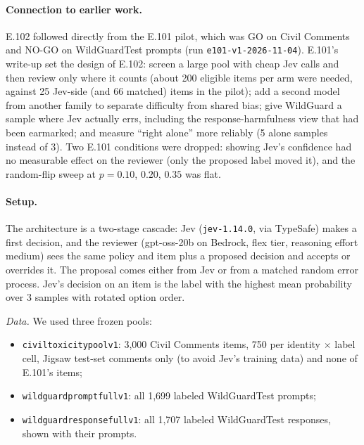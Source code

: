 \documentclass[11pt]{article}
\renewcommand{\_}{\origunderscore\allowbreak}
\begin{document}
\paragraph{Connection to earlier work.}
E.102 followed directly from the E.101 pilot, which was GO on Civil Comments and NO-GO on WildGuardTest prompts (run \texttt{e101-v1-2026-11-04}). E.101's write-up set the design of E.102: screen a large pool with cheap Jev calls and then review only where it counts (about 200 eligible items per arm were needed, against 25 Jev-side (and 66 matched) items in the pilot); add a second model from another family to separate difficulty from shared bias; give WildGuard a sample where Jev actually errs, including the response-harmfulness view that had been earmarked; and measure ``right alone'' more reliably (5 alone samples instead of 3). Two E.101 conditions were dropped: showing Jev's confidence had no measurable effect on the reviewer (only the proposed label moved it), and the random-flip sweep at $p = 0.10$, $0.20$, $0.35$ was flat.

\paragraph{Setup.}
The architecture is a two-stage cascade: Jev (\texttt{jev-1.14.0}, via TypeSafe) makes a first decision, and the reviewer (gpt-oss-20b on Bedrock, flex tier, reasoning effort medium) sees the same policy and item plus a proposed decision and accepts or overrides it. The proposal comes either from Jev or from a matched random error process. Jev's decision on an item is the label with the highest mean probability over 3 samples with rotated option order.

\emph{Data.} We used three frozen pools:
\begin{itemize}[nosep]
  \item \texttt{civil\_toxicity\_pool\_v1}: 3,000 Civil Comments items, 750 per identity $\times$ label cell, Jigsaw test-set comments only (to avoid Jev's training data) and none of E.101's items;
  \item \texttt{wildguard\_prompt\_full\_v1}: all 1,699 labeled WildGuardTest prompts;
  \item \texttt{wildguard\_response\_full\_v1}: all 1,707 labeled WildGuardTest responses, shown with their prompts.
\end{itemize}
\end{document}
